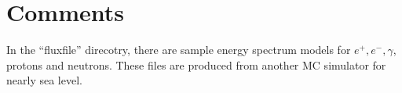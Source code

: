 \documentclass[11pt,a4paper]{jsarticle}
\begin{document}
\section{Comments}
In the ``fluxfile'' direcotry, there are sample energy spectrum models for $e^{+}, e^{-}, \gamma$, 
protons and neutrons. These files are produced from another MC simulator for nearly sea level.
\end{document}
